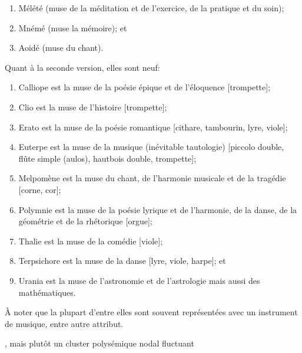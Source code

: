 \documentclass{article}
\begin{document}
{ \renewcommand{\labelenumi}{\arabic{enumi}.} \begin{enumerate}
\item Mélété (muse de la méditation et de l'exercice, de la pratique et du soin); 
\item Mnémé (muse la mémoire); et
\item Aoidé (muse du chant). 
\end{enumerate}
Quant à la seconde version, elles sont neuf:
 \begin{enumerate}
\item Calliope est la muse de la poésie épique et de l’éloquence [trompette];
\item Clio est la muse de l'histoire [trompette];
\item Erato est la muse de la poésie romantique %
[cithare, tambourin, lyre, viole];
\item Euterpe est la muse de la musique (inévitable tautologie) [piccolo double, flûte simple (aulos), hautbois double, trompette];
\item Melpomène est la muse du chant, de l’harmonie musicale et de la tragédie [corne, cor];
\item Polymnie est la muse de la poésie lyrique et de l’harmonie, de la danse, de la géométrie et de la rhétorique [orgue];
\item Thalie est la muse de la comédie [viole];
\item Terpsichore est la muse de la danse %
[lyre, viole, harpe]; et
\item Urania est la muse de l’astronomie et de l’astrologie mais aussi des mathématiques.
\end{enumerate}
À noter que la plupart d'entre elles sont souvent représentées avec un instrument de musique, entre autre attribut.}, mais plutôt un cluster polysémique nodal fluctuant
\end{document}
